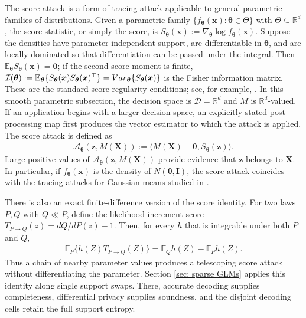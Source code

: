 \documentclass[letterpaper,12pt]{article}
\numberwithin{equation}{section}
\theoremstyle{plain}
\numberwithin{Theorem}{section}
\numberwithin{proposition}{section}
\numberwithin{Lemma}{section}
{
	\theoremstyle{definition}
	\newtheorem{Definition}{Definition}
	\newtheorem{example}{Example}
	\numberwithin{example}{section}
	\newtheorem{fact}{Fact}
	\numberwithin{fact}{section}
	\newtheorem{remark}{Remark}
}
\newcommand{\furtherrev}[1]{#1}
\newcommand{\A}{\mathcal{A}}
\newcommand{\1}{\mathbbm{1}}
\def\bth{{\boldsymbol{\theta}}}
\def\R{{\mathbb R}}
\def\Var{{\rm Var}}
\def\E{\mathbb{E}}
\begin{document}
The score attack is a form of tracing attack applicable to general parametric families of distributions. Given a parametric family $\{f_\bth(\bm x): \bth \in \Theta\}$ with $\Theta \subseteq \R^d$, the score statistic, or simply the score, is $S_\bth(\bm x) := \nabla_\bth \log f_\bth(\bm x)$. Suppose the densities have parameter-independent support, are differentiable in $\bth$, and are locally dominated so that differentiation can be passed under the integral. Then $\E_\bth S_\bth(\bm x)=\bm0$; if the second score moment is finite, $\mathcal I(\bth):=\E_\bth\{S_\bth(\bm x)S_\bth(\bm x)^\top\}=\Var_\bth\{S_\bth(\bm x)\}$ is the Fisher information matrix. These are the standard score regularity conditions; see, for example, \cite{lehmann2006theory}. \furtherrev{In this smooth parametric subsection, the decision space is $\mathcal D=\mathbb R^d$ and $M$ is $\mathbb R^d$-valued. If an application begins with a larger decision space, an explicitly stated post-processing map first produces the vector estimator to which the attack is applied.} The score attack is defined as
\begin{align}\label{eq: score attack}
	\A_\bth(\bm z, M(\bm X)) := \langle M(\bm X) - \bth, S_\bth(\bm z)   \rangle.
\end{align}
Large positive values of $\A_\bth(\bm z, M(\bm X))$ provide evidence that $\bm z$ belongs to $\bm X$. In particular, if $f_\bth(\bm x)$ is the density of $N(\bth, \bm I)$, the score attack coincides with the tracing attacks for Gaussian means studied in \citep{dwork2015robust, kamath2018privately, cai2021cost}.

{There is also an exact finite-difference version of the score identity. For two laws $P,Q$ with $Q\ll P$, define the likelihood-increment score $T_{P\to Q}(z)=dQ/dP(z)-1$. Then, for every $h$ that is integrable under both $P$ and $Q$,
\begin{align*}
\E_P\{h(Z)T_{P\to Q}(Z)\}=\E_Qh(Z)-\E_Ph(Z).
\end{align*}
Thus a chain of nearby parameter values produces a telescoping score attack without differentiating the parameter. Section \ref{sec: sparse GLMs} applies this identity along single support swaps. There, accurate decoding supplies completeness, differential privacy supplies soundness, and the disjoint decoding cells retain the full support entropy.}
\end{document}
